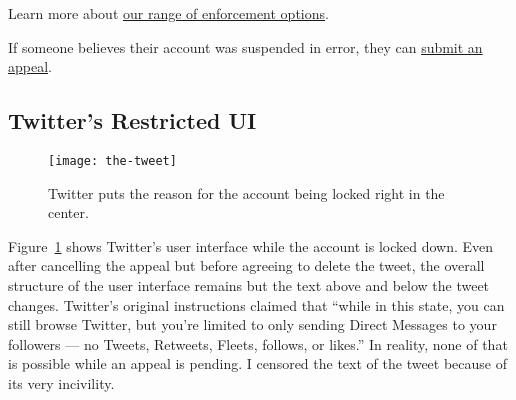 Learn more about
\href{https://web.archive.org/web/20220905021323/https://help.twitter.com/en/rules-and-policies/enforcement-options.html}{our
range of enforcement options}.

If someone believes their account was suspended in error, they can
\href{https://web.archive.org/web/20220905021323/https://help.twitter.com/forms/general?subtopic=suspended}{submit
an appeal}.


\subsection{Twitter's Restricted UI}
\label{sec:twitter:thetweet}

\begin{figure}
\centering
\texttt{[image: the-tweet]}
\caption{Twitter puts the reason for the account being locked right in the center.}
\label{fig:thetweet}
\end{figure}

Figure~\ref{fig:thetweet} shows Twitter's user interface while the account is
locked down. Even after cancelling the appeal but before agreeing to delete the
tweet, the overall structure of the user interface remains but the text above
and below the tweet changes. Twitter's original instructions claimed that
``while in this state, you can still browse Twitter, but you're limited to only
sending Direct Messages to your followers --- no Tweets, Retweets, Fleets,
follows, or likes.'' In reality, none of that is possible while an appeal is
pending. I censored the text of the tweet because of its very incivility.
